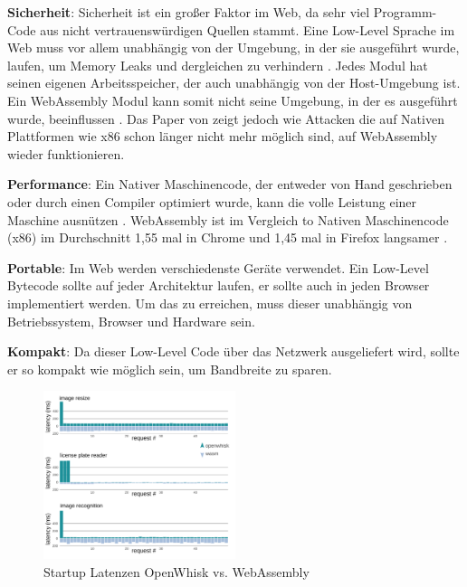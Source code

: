 \begin{flushleft}


\textbf{Sicherheit}: Sicherheit ist ein großer Faktor im Web, da sehr viel Programm-Code aus nicht vertrauenswürdigen Quellen stammt. Eine Low-Level Sprache im Web muss vor allem unabhängig von der Umgebung, in der sie ausgeführt wurde, laufen, um Memory Leaks und dergleichen zu verhindern \autocite[p.~185-186]{Haas2017}. Jedes Modul hat seinen eigenen Arbeitsspeicher, der auch unabhängig von der Host-Umgebung ist. Ein WebAssembly Modul kann somit nicht seine Umgebung, in der es ausgeführt wurde, beeinflussen \autocite[p.~188]{Haas2017}. Das Paper von \cite{Lehmann} zeigt jedoch wie Attacken die auf Nativen Plattformen wie x86 schon länger nicht mehr möglich sind, auf WebAssembly wieder funktionieren.

\hfill \break

\textbf{Performance}: Ein Nativer Maschinencode, der entweder von Hand geschrieben oder durch einen Compiler optimiert wurde, kann die volle Leistung einer Maschine ausnützen \autocite[p.~186]{Haas2017}. WebAssembly ist im Vergleich to Nativen Maschinencode (x86) im Durchschnitt 1,55 mal in Chrome und 1,45 mal in Firefox langsamer \autocite[p.~118]{Jangda}.

\hfill \break

\textbf{Portable}: Im Web werden verschiedenste Geräte verwendet. Ein Low-Level Bytecode sollte auf jeder Architektur laufen, er sollte auch in jeden Browser implementiert werden. Um das zu erreichen, muss dieser unabhängig von Betriebssystem, Browser und Hardware sein. \autocite[p.~186]{Haas2017}

\hfill \break

\textbf{Kompakt}: Da dieser Low-Level Code über das Netzwerk ausgeliefert wird, sollte er so kompakt wie möglich sein, um Bandbreite zu sparen. \autocite[p.~186]{Haas2017}

\end{flushleft}

\begin{figure}[t]
	\centering
	\includegraphics[width=0.5\textwidth]{images/RequestTimesSlow.png}
	\caption{
		Startup Latenzen OpenWhisk vs. WebAssembly \autocite[p.~232]{Hall2019}
	}
	\label{figure:StartupLatFirst}
\end{figure}

